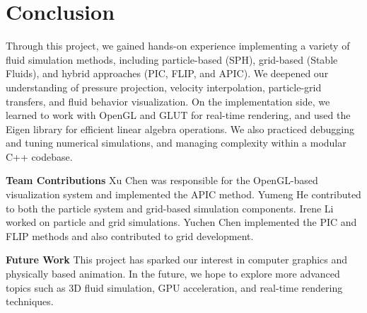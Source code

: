 \section{Conclusion}
 
Through this project, we gained hands-on experience implementing a variety of fluid simulation methods, including particle-based (SPH), grid-based (Stable Fluids), and hybrid approaches (PIC, FLIP, and APIC). We deepened our understanding of pressure projection, velocity interpolation, particle-grid transfers, and fluid behavior visualization. On the implementation side, we learned to work with OpenGL and GLUT for real-time rendering, and used the Eigen library for efficient linear algebra operations. We also practiced debugging and tuning numerical simulations, and managing complexity within a modular C++ codebase.

\textbf{Team Contributions}   Xu Chen was responsible for the OpenGL-based visualization system and implemented the APIC method. Yumeng He contributed to both the particle system and grid-based simulation components. Irene Li worked on particle and grid simulations. Yuchen Chen implemented the PIC and FLIP methods and also contributed to grid development.

\textbf{Future Work }   This project has sparked our interest in computer graphics and physically based animation. In the future, we hope to explore more advanced topics such as 3D fluid simulation, GPU acceleration, and real-time rendering techniques.